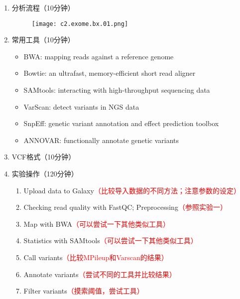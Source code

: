 \documentclass{TIJMUjiaoanSY}
\begin{document}
\noindent
\begin{enumerate}
  \item 分析流程（10分钟）
    \begin{figure}[ht]
      \centering
      \texttt{[image: c2.exome.bx.01.png]}
    \end{figure}

  \item 常用工具（10分钟）
    \begin{itemize}
      \item BWA: mapping reads against a reference genome
      \item Bowtie: an ultrafast, memory-efficient short read aligner
      \item SAMtools: interacting with high-throughput sequencing data
      \item VarScan: detect variants in NGS data
      \item SnpEff: genetic variant annotation and effect prediction toolbox
      \item ANNOVAR: functionally annotate genetic variants
    \end{itemize}

  \item VCF格式（10分钟）

  \item 实验操作（120分钟）
    \begin{enumerate}
      \item Upload data to Galaxy\textcolor{red}{（比较导入数据的不同方法；注意参数的设定）}
      \item Checking read quality with FastQC; Preprocessing\textcolor{red}{（参照实验一）}
      \item Map with BWA\textcolor{red}{（可以尝试一下其他类似工具）}
      \item Statistics with SAMtools\textcolor{red}{（可以尝试一下其他类似工具）}
      \item Call variants\textcolor{red}{（比较MPileup和Varscan的结果）}
      \item Annotate variants\textcolor{red}{（尝试不同的工具并比较结果）}
      \item Filter variants\textcolor{red}{（摸索阈值，尝试工具）}
    \end{enumerate}
\end{enumerate}


\otherTail
\end{document}

